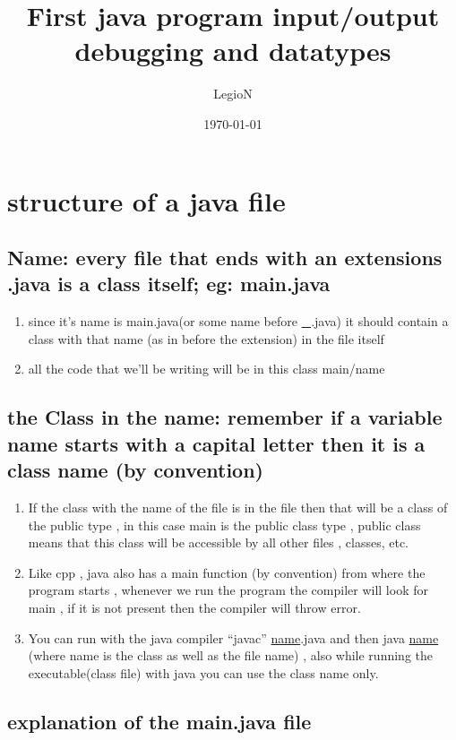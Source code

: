 \documentclass[11pt]{article}
\author{LegioN}
\date{\today}
\title{First java program input/output debugging and datatypes}
\begin{document}
\maketitle
\tableofcontents


\section{structure of a java file}
\label{sec:org0617776}

\subsection{Name: every file that ends with an extensions .java is a class itself; eg: main.java}
\label{sec:orgfbc368d}
\begin{enumerate}
\item since it's name is main.java(or some name before \uline{\_}.java) it should contain a class with that name (as in before the extension) in the file itself
\item all the code that we'll be writing will be in this class main/name
\end{enumerate}
\subsection{the Class in the name: remember if a variable name starts with a capital letter then it is a class name (by convention)}
\label{sec:org88a5777}
\begin{enumerate}
\item If the class with the name of the file is in the file then that will be a class of the public type , in this case main is the public class type , public class means that this class will be accessible by all other files , classes, etc.
\item Like cpp , java also has a main function (by convention) from where the program starts , whenever we run the program the compiler will look for main , if it is not present then the compiler will throw error.
\item You can run with the java compiler ``javac'' \uline{name}.java and then java \uline{name} (where name is the class as well as the file name) , also while running the executable(class file) with java you can use the class name only.
\end{enumerate}

\subsection{explanation of the main.java file}
\label{sec:orgd238863}
\end{document}
